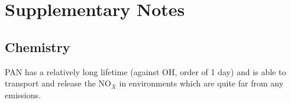 
\chapter{Supplementary Notes}
  
  \section{Chemistry}
    
    PAN has a relatively long lifetime (against OH, order of 1 day) and is able to transport and release the NO$_X$ in environments which are quite far from any emissions.